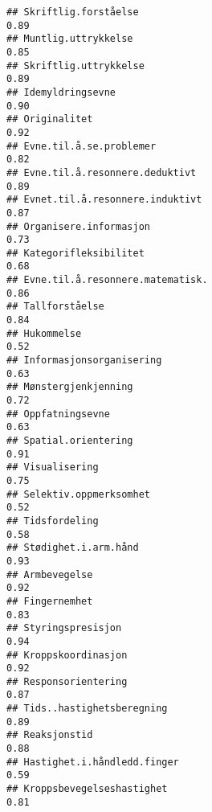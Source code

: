\documentclass[
]{article}
\begin{document}
\begin{verbatim}
## Skriftlig.forståelse                                                             0.89
## Muntlig.uttrykkelse                                                              0.85
## Skriftlig.uttrykkelse                                                            0.89
## Idemyldringsevne                                                                 0.90
## Originalitet                                                                     0.92
## Evne.til.å.se.problemer                                                          0.82
## Evne.til.å.resonnere.deduktivt                                                   0.89
## Evnet.til.å.resonnere.induktivt                                                  0.87
## Organisere.informasjon                                                           0.73
## Kategorifleksibilitet                                                            0.68
## Evne.til.å.resonnere.matematisk.                                                 0.86
## Tallforståelse                                                                   0.84
## Hukommelse                                                                       0.52
## Informasjonsorganisering                                                         0.63
## Mønstergjenkjenning                                                              0.72
## Oppfatningsevne                                                                  0.63
## Spatial.orientering                                                              0.91
## Visualisering                                                                    0.75
## Selektiv.oppmerksomhet                                                           0.52
## Tidsfordeling                                                                    0.58
## Stødighet.i.arm.hånd                                                             0.93
## Armbevegelse                                                                     0.92
## Fingernemhet                                                                     0.83
## Styringspresisjon                                                                0.94
## Kroppskoordinasjon                                                               0.92
## Responsorientering                                                               0.87
## Tids..hastighetsberegning                                                        0.89
## Reaksjonstid                                                                     0.88
## Hastighet.i.håndledd.finger                                                      0.59
## Kroppsbevegelseshastighet                                                        0.81

\end{verbatim}
\end{document}
